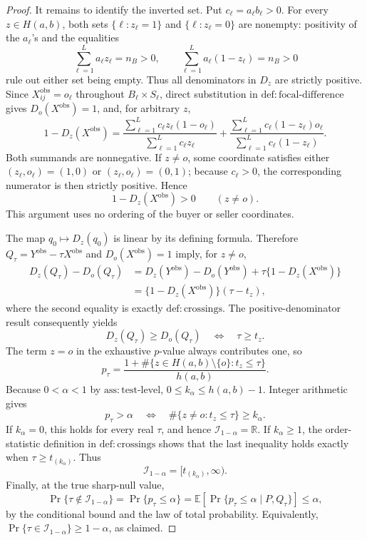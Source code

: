 \documentclass{article}
\begin{document}
\begin{proof}
It remains to identify the inverted set.  Put \(c_\ell=a_\ell b_\ell>0\).  For every \(z\in H(a,b)\), both sets \(\{\ell:z_\ell=1\}\) and \(\{\ell:z_\ell=0\}\) are nonempty: positivity of the \(a_\ell\)'s and the equalities
\[
 \sum_{\ell=1}^{L}a_\ell z_\ell=n_B>0,
 \qquad
 \sum_{\ell=1}^{L}a_\ell(1-z_\ell)=n_B>0
\]
rule out either set being empty.  Thus all denominators in \(D_z\) are strictly positive.  Since \(X_{ij}^{\mathrm{obs}}=o_\ell\) throughout \(B_\ell\times S_\ell\), direct substitution in \(\mathrm{def{:}focal\mbox{-}difference}\) gives \(D_o(X^{\mathrm{obs}})=1\), and, for arbitrary \(z\),
\[
 1-D_z(X^{\mathrm{obs}})
 =
 \frac{\sum_{\ell=1}^{L}c_\ell z_\ell(1-o_\ell)}
 {\sum_{\ell=1}^{L}c_\ell z_\ell}
 +
 \frac{\sum_{\ell=1}^{L}c_\ell(1-z_\ell)o_\ell}
 {\sum_{\ell=1}^{L}c_\ell(1-z_\ell)}.
\]
Both summands are nonnegative.  If \(z\ne o\), some coordinate satisfies either \((z_\ell,o_\ell)=(1,0)\) or \((z_\ell,o_\ell)=(0,1)\); because \(c_\ell>0\), the corresponding numerator is then strictly positive.  Hence
\[
 1-D_z(X^{\mathrm{obs}})>0
 \qquad(z\ne o).
\]
This argument uses no ordering of the buyer or seller coordinates.

The map \(q_0\mapsto D_z(q_0)\) is linear by its defining formula.  Therefore \(Q_\tau=Y^{\mathrm{obs}}-\tau X^{\mathrm{obs}}\) and \(D_o(X^{\mathrm{obs}})=1\) imply, for \(z\ne o\),
\[
 \begin{aligned}
 D_z(Q_\tau)-D_o(Q_\tau)
 &=D_z(Y^{\mathrm{obs}})-D_o(Y^{\mathrm{obs}})
   +\tau\{1-D_z(X^{\mathrm{obs}})\}\\
 &=\{1-D_z(X^{\mathrm{obs}})\}(\tau-t_z),
 \end{aligned}
\]
where the second equality is exactly \(\mathrm{def{:}crossings}\).  The positive-denominator result consequently yields
\[
 D_z(Q_\tau)\ge D_o(Q_\tau)
 \quad\Longleftrightarrow\quad
 \tau\ge t_z.
\]
The term \(z=o\) in the exhaustive \(p\)-value always contributes one, so
\[
 p_\tau
 =\frac{1+\#\{z\in H(a,b)\setminus\{o\}:t_z\le\tau\}}
 {h(a,b)}.
\]
Because \(0<\alpha<1\) by \(\mathrm{ass{:}test\mbox{-}level}\), \(0\le k_\alpha\le h(a,b)-1\).  Integer arithmetic gives
\[
 p_\tau>\alpha
 \quad\Longleftrightarrow\quad
 \#\{z\ne o:t_z\le\tau\}\ge k_\alpha.
\]
If \(k_\alpha=0\), this holds for every real \(\tau\), and hence \(\mathcal I_{1-\alpha}=\mathbb R\).  If \(k_\alpha\ge1\), the order-statistic definition in \(\mathrm{def{:}crossings}\) shows that the last inequality holds exactly when \(\tau\ge t_{(k_\alpha)}\).  Thus
\[
 \mathcal I_{1-\alpha}=[t_{(k_\alpha)},\infty).
\]
Finally, at the true sharp-null value,
\[
 \Pr\{\tau\notin\mathcal I_{1-\alpha}\}
 =\Pr\{p_\tau\le\alpha\}
 =\mathbb E\!\left[
   \Pr\{p_\tau\le\alpha\mid P,Q_\tau\}
 \right]
 \le\alpha,
\]
by the conditional bound and the law of total probability.  Equivalently, \(\Pr\{\tau\in\mathcal I_{1-\alpha}\}\ge1-\alpha\), as claimed.
\end{proof}
\end{document}
